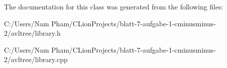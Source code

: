 The documentation for this class was generated from the following files\+:\begin{DoxyCompactItemize}
\item 
C\+:/\+Users/\+Nam Pham/\+C\+Lion\+Projects/blatt-\/7-\/aufgabe-\/1-\/cminusminus-\/2/avltree/library.\+h\item 
C\+:/\+Users/\+Nam Pham/\+C\+Lion\+Projects/blatt-\/7-\/aufgabe-\/1-\/cminusminus-\/2/avltree/library.\+cpp\end{DoxyCompactItemize}
